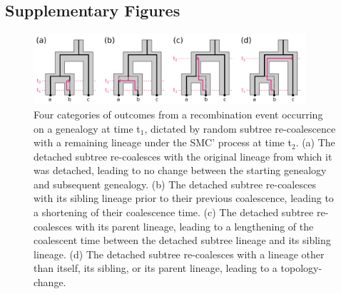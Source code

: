 \documentclass[11pt]{article}
\begin{document}
\subsection{Supplementary Figures}

\begin{figure}[p]
	\centering
	\includegraphics[width=0.9\textwidth]{figures/Fig2-new-recomb-types.pdf}
	\caption{
		Four categories of outcomes from a recombination event occurring on a
		genealogy at time t$_1$, dictated by random subtree re-coalescence with
		a remaining lineage under the SMC' process at time t$_2$. (a) The
		detached subtree re-coalesces with the original lineage from which it
		was detached, leading to no change between the starting genealogy and 
		subsequent genealogy. (b) The detached subtree re-coalesces with its
		sibling lineage prior to their previous coalescence, leading to a shortening
		of their coalescence time. (c) The detached subtree re-coalesces with
		its parent lineage, leading to a lengthening of the coalescent time 
		between the detached subtree lineage and its sibling lineage. (d) The
		detached subtree re-coalesces with a lineage other than itself, its sibling,
		or its parent lineage, leading to a topology-change. 
	}
     \label{fig:figS-recomb-types}
\end{figure}

\end{document}
